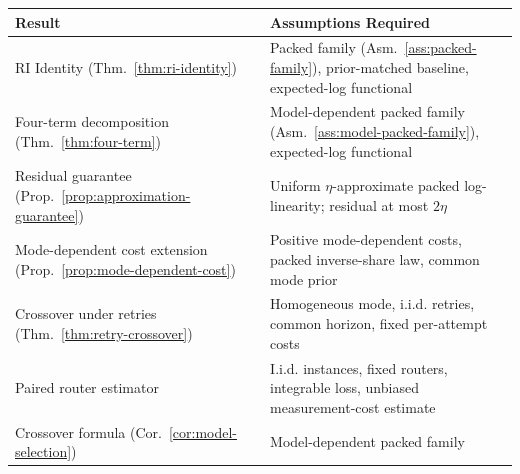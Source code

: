 \documentclass[10pt,twocolumn]{article}
\theoremstyle{paperplain}
\theoremstyle{paperdefinition}
\theoremstyle{paperremark}
\begin{document}
\begin{center}
\small
\renewcommand{\arraystretch}{1.2}
\begin{tabular}{@{}lp{7cm}@{}}
\toprule
\textbf{Result} & \textbf{Assumptions Required} \\
\midrule
RI Identity (Thm.~\ref{thm:ri-identity}) & Packed family (Asm.~\ref{ass:packed-family}), prior-matched baseline, expected-log functional \\
Four-term decomposition (Thm.~\ref{thm:four-term}) & Model-dependent packed family (Asm.~\ref{ass:model-packed-family}), expected-log functional \\
Residual guarantee (Prop.~\ref{prop:approximation-guarantee}) & Uniform $\eta$-approximate packed log-linearity; residual at most $2\eta$ \\
Mode-dependent cost extension (Prop.~\ref{prop:mode-dependent-cost}) & Positive mode-dependent costs, packed inverse-share law, common mode prior \\
Crossover under retries (Thm.~\ref{thm:retry-crossover}) & Homogeneous mode, i.i.d. retries, common horizon, fixed per-attempt costs \\
Paired router estimator & I.i.d. instances, fixed routers, integrable loss, unbiased measurement-cost estimate \\
Crossover formula (Cor.~\ref{cor:model-selection}) & Model-dependent packed family \\
\bottomrule
\end{tabular}
\end{center}
\end{document}
